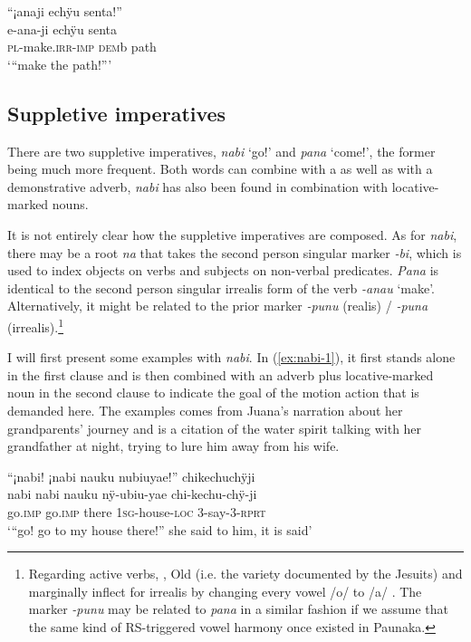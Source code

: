 \ea\label{ex:eimp-7}
\begingl
\glpreamble “¡anaji echÿu senta!”\\
\gla e-ana-ji echÿu senta\\
\textsc{pl}-make.\textsc{irr}-\textsc{imp} \textsc{dem}b path\\
\glft ‘“make the path!”’
\endgl
\trailingcitation{[jmx-c120429ls-x5.063]}
\xe
{}

\subsection{Suppletive imperatives}\label{sec:SuppletiveImperatives}

There are two suppletive imperatives, \textit{nabi} ‘go!’ and \textit{pana} ‘come!’, the former being much more frequent. Both words can combine with a  as well as with a demonstrative adverb, \textit{nabi} has also been found in combination with locative-marked nouns.

It is not entirely clear how the suppletive imperatives are composed. As for \textit{nabi}, there may be a root \textit{na} that takes the second person singular marker \textit{-bi}, which is used to index objects on verbs and subjects on non-verbal predicates. \textit{Pana} is identical to the second person singular irrealis form of the verb \textit{-anau} ‘make’. Alternatively, it might be related to the prior  marker \textit{-punu} (realis) / \textit{-puna} (irrealis).\footnote{Regarding active verbs, , Old  (i.e. the  variety documented by the Jesuits) and marginally  inflect for irrealis by changing every vowel /o/ to /a/ \citep[103]{DanielsenTerhartSubm}. The marker \textit{-punu} may be related to \textit{pana} in a similar fashion if we assume that the same kind of RS-triggered vowel harmony once existed in Paunaka.}

I will first present some examples with \textit{nabi}. In (\ref{ex:nabi-1}), it first stands alone in the first clause and is then combined with an adverb plus locative-marked noun in the second clause to indicate the goal of the motion action that is demanded here. The examples comes from Juana’s narration about her grandparents’ journey and is a citation of the water spirit talking with her grandfather at night, trying to lure him away from his wife.

\ea\label{ex:nabi-1}
\begingl
\glpreamble “¡nabi! ¡nabi nauku nubiuyae!” chikechuchÿji\\
\gla nabi nabi nauku nÿ-ubiu-yae chi-kechu-chÿ-ji\\
\glb go.\textsc{imp} go.\textsc{imp} there 1\textsc{sg}-house-\textsc{loc} 3-say-3-\textsc{rprt}\\
\glft ‘“go! go to my house there!” she said to him, it is said’
\endgl
\trailingcitation{[jxx-p151016l-2.195]}
\xe

